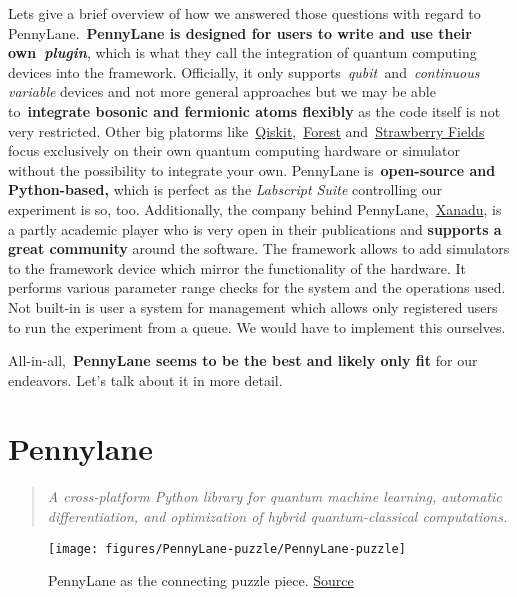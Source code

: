 \documentclass[%
 reprint,
 amsmath,amssymb,
 aps,
]{revtex4-1}
\begin{document}
Lets give a brief overview of how we answered those questions with
regard to PennyLane.~\textbf{PennyLane is designed for users to write
and use their own~}\emph{\textbf{plugin}}, which is what they call the
integration of quantum computing devices into the framework. Officially,
it only supports~\emph{qubit~}and~\emph{continuous variable} devices and
not more general approaches but we may be able to~\textbf{integrate
bosonic and fermionic atoms flexibly} as the code itself is not very
restricted. Other big platorms
like~\href{https://qiskit.org/}{Qiskit},~\href{http://docs.rigetti.com/en/stable/}{Forest}
and~\href{https://strawberryfields.readthedocs.io/en/stable/}{Strawberry
Fields} focus exclusively on their own quantum computing hardware or
simulator without the possibility to integrate your own. PennyLane
is~\textbf{open-source and Python-based,} which is perfect as the
\emph{Labscript Suite} controlling our experiment is so, too.
Additionally, the company behind
PennyLane,~\href{https://www.xanadu.ai/}{Xanadu}, is a partly academic
player who is very open in their publications and \textbf{supports a
great community} around the software. The framework allows to add
simulators to the framework device which mirror the functionality of the
hardware. It performs various parameter range checks for the system and
the operations used. Not built-in is user a system for management which
allows only registered users to run the experiment from a queue. We
would have to implement this ourselves.

All-in-all,~\textbf{PennyLane seems to be the best and likely only fit}
for our endeavors. Let's talk about it in more detail.

\section*{Pennylane}

{\label{935975}}

\begin{quote}
\emph{A cross-platform Python library for quantum machine learning,
automatic differentiation, and optimization of hybrid quantum-classical
computations.}
\end{quote}
\begin{figure}[h!]
\begin{center}
\texttt{[image: figures/PennyLane-puzzle/PennyLane-puzzle]}
\caption{{PennyLane as the connecting puzzle piece.
\href{https://pennylane.readthedocs.io/en/stable/introduction/pennylane.html}{Source}
{\label{477211}}%
}}
\end{center}
\end{figure}
\end{document}
